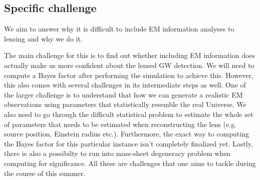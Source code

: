 \documentclass[pdflatex,sn-mathphys-num]{sn-jnl}%
\theoremstyle{thmstyleone}%
\theoremstyle{thmstyletwo}%
\theoremstyle{thmstylethree}%
\begin{document}
\subsection{Specific challenge}
We aim to answer why it is difficult to include EM information analyses to lensing and why we do it.

The main challenge for this is to find out whether including EM information does actually make us more confident about the lensed GW detection. We will need to compute a Bayes factor after performing the simulation to achieve this. However, this also comes with several challenges in its intermediate steps as well. One of the larger challenge is to understand that how we can generate a realistic EM observations using parameters that statistically resemble the real Universe. We also need to go through the difficult statistical problem to estimate the whole set of parameters that needs to be estimated when reconstructing the lens (e.g. source position, Einstein radius etc.). Furthermore, the exact way to computing the Bayes factor for this particular instance isn't completely finalized yet. Lastly, there is also a possibilty to run into mass-sheet degeneracy problem when computing for significance. All these are challenges that one aims to tackle during the course of this summer.
\end{document}
